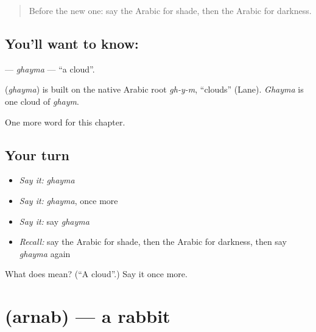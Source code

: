 \label{lesson:AR-C134-ghayma}



\begin{quote}
Before the new one: say the Arabic for shade, then the Arabic for darkness.
\end{quote}

\subsection*{You'll want to know: }
\textbf{} — \emph{ghayma} — \textquotedblleft{}a cloud\textquotedblright{}.

\begin{cousinweb}
\textbf{} (\emph{ghayma}) is built on the native Arabic root \emph{gh-y-m}, \textquotedblleft{}clouds\textquotedblright{} (Lane). \emph{Ghayma} is one cloud of \emph{ghaym}.
\end{cousinweb}

\begin{grammarlens}[title={What you've built}]
One more word for this chapter.
\end{grammarlens}

\subsection*{Your turn}
\begin{itemize}
\raggedright
  \item \emph{Say it:} \emph{ghayma}
  \item \emph{Say it:} \emph{ghayma}, once more
  \item \emph{Say it:} say \emph{ghayma}
  \item \emph{Recall:} say the Arabic for shade, then the Arabic for darkness, then say \emph{ghayma} again
\end{itemize}

\begin{tcolorbox}[breakable,colback=teal!4,colframe=teal!35!black,title={Before you move on}]
What does  mean? (\textquotedblleft{}A cloud\textquotedblright{}.) Say it once more.
\end{tcolorbox}
\section[\texorpdfstring{\ar{أرنب} (arnab)}{أرنب (arnab)}]{ (arnab) — a rabbit}

\label{lesson:AR-C134-arnab}



